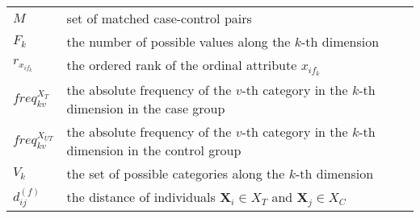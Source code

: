 \begin{tabular}{lp{10cm}}
	   
	$M$                    & set of matched case-control pairs                                                                                                 \\
	$F_k$                  & the number of possible values along the $k$-th dimension                                                                          \\
	$r_{x_{if_k}}$         & the ordered rank of the ordinal attribute $x_{if_k}$                                                                              \\
	$freq^{X_T}_{kv}$              & the absolute frequency of the $v$-th category in the $k$-th dimension in the case group                      \\
	$freq^{X_{UT}}_{kv}$           & the absolute frequency of the $v$-th category in the $k$-th dimension in the control group                   \\
	$V_k$                          & the set of possible categories along the $k$-th dimension                                                    \\ 
	$d_{ij}^{(f)}$                 & the distance of individuals $\textbf{X}_i \in X_T$ and $\textbf{X}_j \in X_C$                                \\




\end{tabular}
